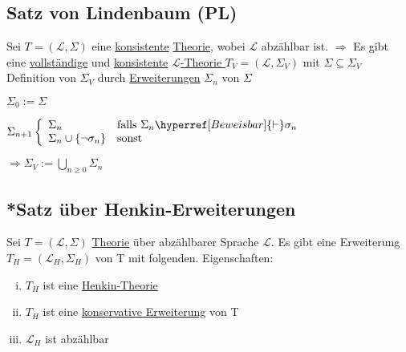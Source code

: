\documentclass[12pt,a4paper]{article} %
\begin{document}
	\subsection{Satz von Lindenbaum (PL)}
	Sei $T = (\mathcal{L}, \Sigma)$ eine \hyperref[PLKonsistent]{konsistente} \hyperref[Theorie]{Theorie}, wobei $\mathcal{L}$ abzählbar ist. \newline 
	$\Rightarrow$ Es gibt eine \hyperref[TheorieVollstandig]{vollständige} und \hyperref[PLKonsistent]{konsistente} \hyperref[Theorie]{$\mathcal{L}$-Theorie $T_V = (\mathcal{L}, \Sigma_V)$} mit $\Sigma \subseteq \Sigma_V$ \newline
	Definition von $\Sigma_V$ durch \hyperref[Erweiterung]{Erweiterungen} $\Sigma_n$ von $\Sigma$
	
	$\Sigma_0 := \Sigma$
	
	$\Sigma_{n + 1} \left\lbrace 
		\begin{array}{l l}
			\Sigma_n & \text{falls } \Sigma_n \hyperref[Beweisbar]{\vdash} \sigma_n \\
			\Sigma_n \cup \{\neg \sigma_n\} & \text{sonst}
		\end{array}
	\right.$
	
	$\Rightarrow \Sigma_V := \bigcup\limits_{n \ge 0} \Sigma_n$
	
	\subsection{*Satz über Henkin-Erweiterungen}
	\label{HenkinErweiterung}
	Sei $T = (\mathcal{L}, \Sigma)$ \hyperref[Theorie]{Theorie} über abzählbarer Sprache $\mathcal{L}$. Es gibt eine Erweiterung $T_H = (\mathcal{L}_H, \Sigma_H)$ von T mit folgenden. \newline 
	Eigenschaften:
	
	\begin{enumerate}[(i)]
		\item $T_H$ ist eine \hyperref[Henkin]{Henkin-Theorie}
		\item $T_H$ ist eine \hyperref[Erweiterung]{konservative Erweiterung} von T
		\item $\mathcal{L}_H$ ist abzählbar
	\end{enumerate}
\end{document}
